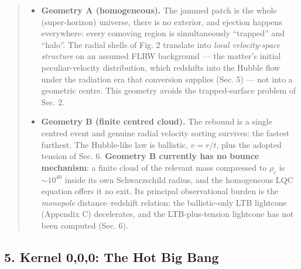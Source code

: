 \documentclass[
  11pt,
]{article}
\providecommand{\tightlist}{%
  \setlength{\itemsep}{0pt}\setlength{\parskip}{0pt}}
\begin{document}
\begin{quote}
\begin{itemize}
\tightlist
\item
  \textbf{Geometry A (homogeneous).} The jammed patch is the whole
  (super-horizon) universe, there is no exterior, and ejection happens
  everywhere: every comoving region is simultaneously ``trapped'' and
  ``halo''. The radial shells of Fig. 2 translate into \emph{local
  velocity-space structure} on an assumed FLRW background --- the
  matter's initial peculiar-velocity distribution, which redshifts into
  the Hubble flow under the radiation era that conversion supplies (Sec.
  5) --- not into a geometric centre. This geometry avoids the
  trapped-surface problem of Sec. 2.
\item
  \textbf{Geometry B (finite centred cloud).} The rebound is a single
  centred event and genuine radial velocity sorting survives: the
  fastest furthest. The Hubble-like law is ballistic, \(v = r/t\), plus
  the adopted tension of Sec. 6. \textbf{Geometry B currently has no
  bounce mechanism}: a finite cloud of the relevant mass compressed to
  \(\rho_c\) is \(\sim\!10^{40}\) inside its own Schwarzschild radius,
  and the homogeneous LQC equation offers it no exit. Its principal
  observational burden is the \emph{monopole} distance--redshift
  relation: the ballistic-only LTB lightcone (Appendix C) decelerates,
  and the LTB-plus-tension lightcone has not been computed (Sec. 6).
\end{itemize}
\end{quote}

\hypertarget{kernel-000-the-hot-big-bang}{%
\subsection{\texorpdfstring{\textbf{5. Kernel 0,0,0: The Hot Big
Bang}}{5. Kernel 0,0,0: The Hot Big Bang}}\label{kernel-000-the-hot-big-bang}}
\end{document}
